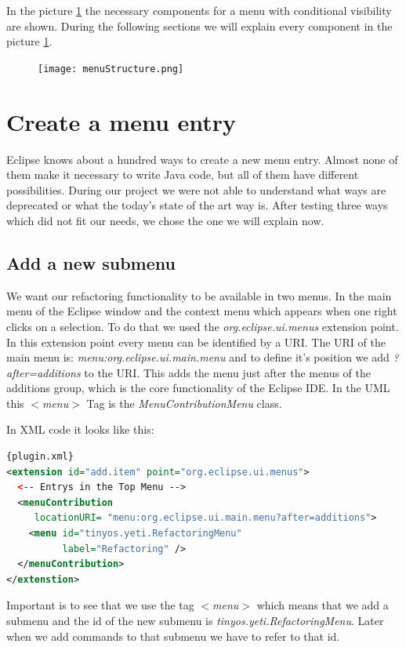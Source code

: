 \documentclass[a4paper,10pt]{report}
\begin{document}
In the picture \ref{menuStructure} the necessary components for a menu with conditional visibility are shown. During the following sections we will explain every component in the picture \ref{menuStructure}.
\begin{figure}[h]
\centering
\texttt{[image: menuStructure.png]}
\label{menuStructure} 
\end{figure}

\section{Create a menu entry}
Eclipse knows about a hundred ways to create a new menu entry. Almost none of them make it necessary to write Java code, but all of them have different possibilities. 
During our project we were not able to understand what ways are deprecated or what the today's state of the art way is. After testing three ways which did not fit our needs,
we chose the one we will explain now. 

\subsection{Add a new submenu}
We want our refactoring functionality to be available in two menus. In the main menu of the Eclipse window and the context menu which appears when one right clicks on
a selection. To do that we used the {\it org.eclipse.ui.menus} extension point. In this extension point every menu can be identified by a URI. The URI of the main menu is:
{\it menu:org.eclipse.ui.main.menu} and to define it's position we add {\it ?after=additions} to the URI. This adds the menu just after the menus of the additions group, 
which is the core functionality of the Eclipse IDE. In the UML this {\it $<$menu$>$} Tag is the {\it MenuContributionMenu} class.

In XML code it looks like this:
\begin{lstlisting}[language=XML,caption=Create menu folder ({\it plugin.xml})]{plugin.xml}
<extension id="add.item" point="org.eclipse.ui.menus">
  <-- Entrys in the Top Menu -->
  <menuContribution
     locationURI= "menu:org.eclipse.ui.main.menu?after=additions">
    <menu id="tinyos.yeti.RefactoringMenu"
          label="Refactoring" />
  </menuContribution>
</extenstion>
\end{lstlisting}
Important is to see that we use the tag {\it $<$menu$>$} which means that we add a submenu and the id of the new submenu is {\it tinyos.yeti.RefactoringMenu}. 
Later when we add commands to that submenu we have to refer to that id.
\end{document}
